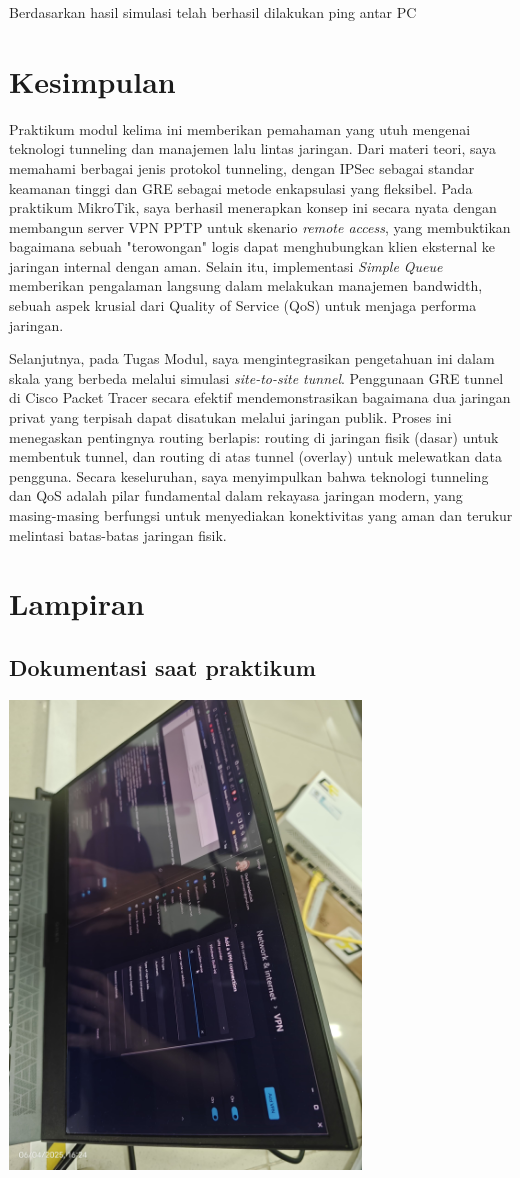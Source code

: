 Berdasarkan hasil simulasi telah berhasil dilakukan ping antar PC

\section{Kesimpulan}
Praktikum modul kelima ini memberikan pemahaman yang utuh mengenai teknologi tunneling dan manajemen lalu lintas jaringan. Dari materi teori, saya memahami berbagai jenis protokol tunneling, dengan IPSec sebagai standar keamanan tinggi dan GRE sebagai metode enkapsulasi yang fleksibel. Pada praktikum MikroTik, saya berhasil menerapkan konsep ini secara nyata dengan membangun server VPN PPTP untuk skenario \textit{remote access}, yang membuktikan bagaimana sebuah "terowongan" logis dapat menghubungkan klien eksternal ke jaringan internal dengan aman. Selain itu, implementasi \textit{Simple Queue} memberikan pengalaman langsung dalam melakukan manajemen bandwidth, sebuah aspek krusial dari Quality of Service (QoS) untuk menjaga performa jaringan.

Selanjutnya, pada Tugas Modul, saya mengintegrasikan pengetahuan ini dalam skala yang berbeda melalui simulasi \textit{site-to-site tunnel}. Penggunaan GRE tunnel di Cisco Packet Tracer secara efektif mendemonstrasikan bagaimana dua jaringan privat yang terpisah dapat disatukan melalui jaringan publik. Proses ini menegaskan pentingnya routing berlapis: routing di jaringan fisik (dasar) untuk membentuk tunnel, dan routing di atas tunnel (overlay) untuk melewatkan data pengguna. Secara keseluruhan, saya menyimpulkan bahwa teknologi tunneling dan QoS adalah pilar fundamental dalam rekayasa jaringan modern, yang masing-masing berfungsi untuk menyediakan konektivitas yang aman dan terukur melintasi batas-batas jaringan fisik.

\section{Lampiran}
\subsection{Dokumentasi saat praktikum}
\includegraphics[width=0.7\textwidth]{P5/img/dokum.jpg}


